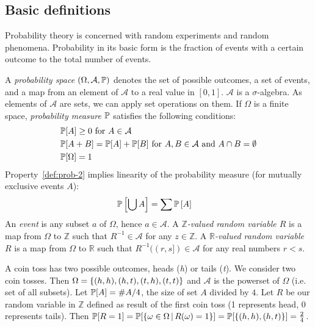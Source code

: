 \subsection{Basic definitions}
\label{sec:bp-def}
%
Probability theory is concerned with random experiments and random phenomena. Probability in its basic form is the fraction of events with a certain outcome to the total number of events.
%
\begin{definition}
  \label{def:prob}
  A \emph{probability space} $(\Omega, \mathcal A, \mathbb P)$ denotes
    the set of possible outcomes, a set of events, and a map from an element of $\mathcal A$ to a real value in $[0,1]$.
    $\mathcal A$ is a $\sigma$-algebra. As elements of $\mathcal A$ are sets, we can apply set operations on them.
    If $\Omega$ is a finite space, \emph{probability measure} $\mathbb P$ satisfies the following conditions:
    \begin{align}
      &\mathbb P[A] \geq 0 \text{ for } A \in \mathcal A \label{def:prob-1} \\
      &\mathbb P[A + B] = \mathbb P[A] + \mathbb P[B] \text{ for } A, B \in \mathcal A \text{ and } A \cap B = \emptyset \label{def:prob-2} \\
      &\mathbb P[\Omega] = 1 \label{def:prob-3}
    \end{align}
    Property~\ref{def:prob-2} implies linearity of the probability measure (for mutually exclusive events $A$):
    \begin{align}
      \mathbb P\left[\bigcup A\right] &= \sum \mathbb P\left[A\right] \label{eq:prob-linear}
    \end{align}
  An \emph{event} is any subset $a$ of $\Omega$, hence $a \in \mathcal A$.
  A \emph{$\mathbb Z$-valued random variable $R$} is a map from $\Omega$ to $\mathbb Z$
  such that $R^{-1} \in \mathcal A$ for any $z \in \mathbb Z$.
  A \emph{$\mathbb R$-valued random variable $R$} is a map from $\Omega$ to $\mathbb R$
  such that $R^{-1}((r, s]) \in \mathcal A$ for any real numbers $r < s$.
\end{definition}
\begin{example}
  \label{ex:cointoss}
  A coin toss has two possible outcomes, heads (\textit h) or tails (\textit t).
  We consider two coin tosses.
  Then $\Omega = \left\{(h, h), (h, t), (t, h), (t, t)\right\}$ and $\mathcal A$ is the powerset of $\Omega$ (i.e. set of all subsets).
  Let $\mathbb P[A] = \#A / 4$, the size of set $A$ divided by $4$.
  Let $R$ be our random variable in $\mathbb Z$ defined as result of the first coin toss (1 represents head, 0 represents tails).
  Then $\mathbb P[R=1] = \mathbb P[\left\{\omega \in \Omega\,|\,R(\omega) = 1\right\}] = \mathbb P[\left\{(h, h), (h, t)\right\}] = \frac24$.
\end{example}


